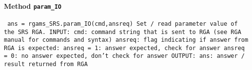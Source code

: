 \paragraph{Method \texttt{param_IO}}
\vspace{1ex}
\texttt{\newline
ans = rgams_SRS.param_IO(cmd,ansreq)\newline
\newline
Set / read parameter value of the SRS RGA.\newline
\newline
INPUT:\newline
cmd: command string that is sent to RGA (see RGA manual for commands and syntax)\newline
ansreq: flag indicating if answer from RGA is expected:\newline
ansreq = 1: answer expected, check for answer\newline
ansreq = 0: no answer expected, don't check for answer\newline
\newline
OUTPUT:\newline
ans: answer / result returned from RGA\newline
\newline
}

